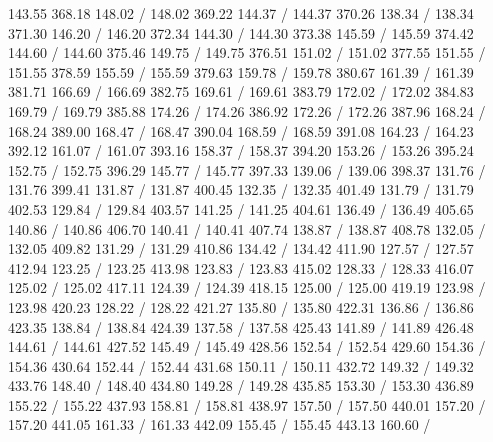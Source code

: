 { 143.55 368.18 148.02 /
 148.02 369.22 144.37 /
 144.37 370.26 138.34 /
 138.34 371.30 146.20 /
 146.20 372.34 144.30 /
 144.30 373.38 145.59 /
 145.59 374.42 144.60 /
 144.60 375.46 149.75 /
 149.75 376.51 151.02 /
 151.02 377.55 151.55 /
 151.55 378.59 155.59 /
 155.59 379.63 159.78 /
 159.78 380.67 161.39 /
 161.39 381.71 166.69 /
 166.69 382.75 169.61 /
 169.61 383.79 172.02 /
 172.02 384.83 169.79 /
 169.79 385.88 174.26 /
 174.26 386.92 172.26 /
 172.26 387.96 168.24 /
 168.24 389.00 168.47 /
 168.47 390.04 168.59 /
 168.59 391.08 164.23 /
 164.23 392.12 161.07 /
 161.07 393.16 158.37 /
 158.37 394.20 153.26 /
 153.26 395.24 152.75 /
 152.75 396.29 145.77 /
 145.77 397.33 139.06 /
 139.06 398.37 131.76 /
 131.76 399.41 131.87 /
 131.87 400.45 132.35 /
 132.35 401.49 131.79 /
 131.79 402.53 129.84 /
 129.84 403.57 141.25 /
 141.25 404.61 136.49 /
 136.49 405.65 140.86 /
 140.86 406.70 140.41 /
 140.41 407.74 138.87 /
 138.87 408.78 132.05 /
 132.05 409.82 131.29 /
 131.29 410.86 134.42 /
 134.42 411.90 127.57 /
 127.57 412.94 123.25 /
 123.25 413.98 123.83 /
 123.83 415.02 128.33 /
 128.33 416.07 125.02 /
 125.02 417.11 124.39 /
 124.39 418.15 125.00 /
 125.00 419.19 123.98 /
 123.98 420.23 128.22 /
 128.22 421.27 135.80 /
 135.80 422.31 136.86 /
 136.86 423.35 138.84 /
 138.84 424.39 137.58 /
 137.58 425.43 141.89 /
 141.89 426.48 144.61 /
 144.61 427.52 145.49 /
 145.49 428.56 152.54 /
 152.54 429.60 154.36 /
 154.36 430.64 152.44 /
 152.44 431.68 150.11 /
 150.11 432.72 149.32 /
 149.32 433.76 148.40 /
 148.40 434.80 149.28 /
 149.28 435.85 153.30 /
 153.30 436.89 155.22 /
 155.22 437.93 158.81 /
 158.81 438.97 157.50 /
 157.50 440.01 157.20 /
 157.20 441.05 161.33 /
 161.33 442.09 155.45 /
 155.45 443.13 160.60 /
}
